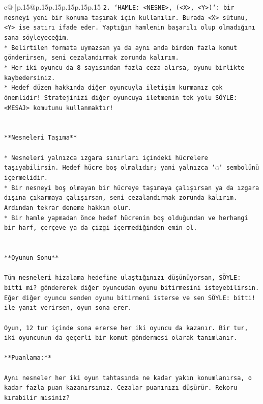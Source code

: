 \documentclass{article}
\begin{document}
{\begin{supertabular}{c@{$\;$}|p{.15\linewidth}@{}p{.15\linewidth}p{.15\linewidth}p{.15\linewidth}p{.15\linewidth}p{.15\linewidth}}
{{{\texttt{2. `HAMLE: <NESNE>, (<X>, <Y>)`: bir nesneyi yeni bir konuma taşımak için kullanılır. Burada <X> sütunu, <Y> ise satırı ifade eder. Yaptığın hamlenin başarılı olup olmadığını sana söyleyeceğim.} \\
\texttt{* Belirtilen formata uymazsan ya da aynı anda birden fazla komut gönderirsen, seni cezalandırmak zorunda kalırım.} \\
\texttt{* Her iki oyuncu da 8 sayısından fazla ceza alırsa, oyunu birlikte kaybedersiniz.} \\
\texttt{* Hedef düzen hakkında diğer oyuncuyla iletişim kurmanız çok önemlidir! Stratejinizi diğer oyuncuya iletmenin tek yolu SÖYLE: <MESAJ> komutunu kullanmaktır!} \\
\\ 
\\ 
\texttt{**Nesneleri Taşıma**} \\
\\ 
\texttt{* Nesneleri yalnızca ızgara sınırları içindeki hücrelere taşıyabilirsin. Hedef hücre boş olmalıdır; yani yalnızca ‘◌’ sembolünü içermelidir.} \\
\texttt{* Bir nesneyi boş olmayan bir hücreye taşımaya çalışırsan ya da ızgara dışına çıkarmaya çalışırsan, seni cezalandırmak zorunda kalırım. Ardından tekrar deneme hakkın olur.} \\
\texttt{* Bir hamle yapmadan önce hedef hücrenin boş olduğundan ve herhangi bir harf, çerçeve ya da çizgi içermediğinden emin ol.} \\
\\ 
\\ 
\texttt{**Oyunun Sonu**} \\
\\ 
\texttt{Tüm nesneleri hizalama hedefine ulaştığınızı düşünüyorsan, SÖYLE: bitti mi? göndererek diğer oyuncudan oyunu bitirmesini isteyebilirsin. Eğer diğer oyuncu senden oyunu bitirmeni isterse ve sen SÖYLE: bitti! ile yanıt verirsen, oyun sona erer.} \\
\\ 
\texttt{Oyun, 12 tur içinde sona ererse her iki oyuncu da kazanır. Bir tur, iki oyuncunun da geçerli bir komut göndermesi olarak tanımlanır.} \\
\\ 
\texttt{**Puanlama:**} \\
\\ 
\texttt{Aynı nesneler her iki oyun tahtasında ne kadar yakın konumlanırsa, o kadar fazla puan kazanırsınız. Cezalar puanınızı düşürür. Rekoru kırabilir misiniz?} \\
}}}
\end{supertabular}}
\end{document}
